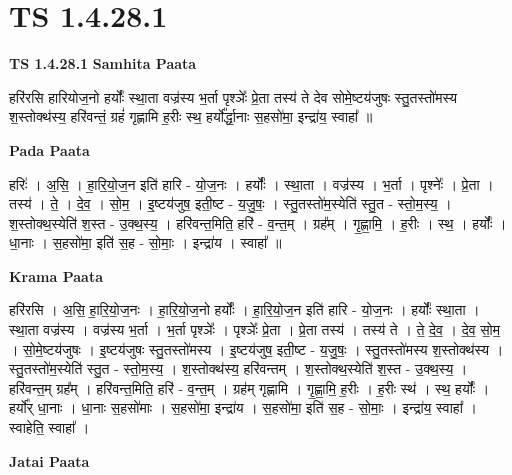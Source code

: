 \documentclass[17pt]{extarticle}
\begin{document}
\section{ TS 1.4.28.1 }

\textbf{TS 1.4.28.1 } \newline
\textbf{Samhita Paata} \newline

हरि॑रसि हारियोज॒नो हर्योः᳚ स्था॒ता वज्र॑स्य भ॒र्ता पृश्ञेः᳚ प्रे॒ता तस्य॑ ते देव सोमे॒ष्टय॑जुषः स्तु॒तस्तो॑मस्य श॒स्तोक्थ॑स्य॒ हरि॑वन्तं॒ ग्रहं॑ गृह्णामि ह॒रीः स्थ॒ हर्यो᳚र्द्धा॒नाः स॒हसो॑मा॒ इन्द्रा॑य॒ स्वाहा᳚ ॥ \newline

\textbf{Pada Paata} \newline

हरिः॑ । अ॒सि॒ । हा॒रि॒यो॒ज॒न इति॑ हारि - यो॒ज॒नः । हर्योः᳚ । स्था॒ता । वज्र॑स्य । भ॒र्ता । पृश्नेः᳚ । प्रे॒ता । तस्य॑ । ते॒ । दे॒व॒ । सो॒म॒ । इ॒ष्टय॑जुष॒ इती॒ष्ट - य॒जु॒षः॒ । स्तु॒तस्तो॑म॒स्येति॑ स्तु॒त - स्तो॒म॒स्य॒ । श॒स्तोक्थ॒स्येति॑ श॒स्त - उ॒क्थ॒स्य॒ । हरि॑वन्त॒मिति॒ हरि॑ - व॒न्त॒म् । ग्रह᳚म् । गृ॒ह्णा॒मि॒ । ह॒रीः । स्थ॒ । हर्योः᳚ । धा॒नाः । स॒हसो॑मा॒ इति॑ स॒ह - सो॒माः॒ । इन्द्रा॑य । स्वाहा᳚ ॥  \newline


\textbf{Krama Paata} \newline

हरि॑रसि । अ॒सि॒ हा॒रि॒यो॒ज॒नः । हा॒रि॒यो॒ज॒नो हर्योः᳚ । हा॒रि॒यो॒ज॒न इति॑ हारि - यो॒ज॒नः । हर्योः᳚ स्था॒ता । स्था॒ता वज्र॑स्य । वज्र॑स्य भ॒र्ता । भ॒र्ता पृश्ञेः᳚ । पृश्ञेः᳚ प्रे॒ता । प्रे॒ता तस्य॑ । तस्य॑ ते । ते॒ दे॒व॒ । दे॒व॒ सो॒म॒ । सो॒मे॒ष्टय॑जुषः । इ॒ष्टय॑जुषः स्तु॒तस्तो॑मस्य । इ॒ष्टय॑जुष॒ इती॒ष्ट - य॒जु॒षः॒ । स्तु॒तस्तो॑मस्य श॒स्तोक्थ॑स्य । स्तु॒तस्तो॑म॒स्येति॑ स्तु॒त - स्तो॒म॒स्य॒ । श॒स्तोक्थ॑स्य॒ हरि॑वन्तम् । श॒स्तोक्थ॒स्येति॑ श॒स्त - उ॒क्थ॒स्य॒ । हरि॑वन्त॒म् ग्रह᳚म् । हरि॑वन्त॒मिति॒ हरि॑ - व॒न्त॒म् । ग्रह॑म् गृह्णामि । गृ॒ह्णा॒मि॒ ह॒रीः । ह॒रीः स्थ॑ । स्थ॒ हर्योः᳚ । हर्यो᳚र् धा॒नाः । धा॒नाः स॒हसो॑माः । स॒हसो॑मा॒ इन्द्रा॑य । स॒हसो॑मा॒ इति॑ स॒ह - सो॒माः॒ । इन्द्रा॑य॒ स्वाहा᳚ । स्वाहेति॒ स्वाहा᳚ । \newline

\textbf{Jatai Paata} \newline
\end{document}
